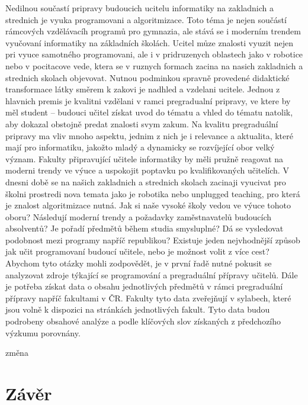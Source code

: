 \documentclass[FP,DP]{tulthesis}
\begin{document}
Nedilnou součastí pripravy budoucich ucitelu informatiky na zakladnich a strednich  je vyuka programovani a algoritmizace. Toto téma je nejen součástí rámcových vzdělávacíh programů pro gymnazia, ale stává se i moderním trendem vyučovaní informatiky na základních školách. Ucitel můze znalosti vyuzit nejen pri vyuce samotného programovani, ale i v pridruzenych oblastech jako v robotice nebo v pocitacove vede, ktera se v ruznych formach zacina na nasich zakladnich a strednich skolach objevovat. Nutnou podminkou spravně provedené didaktické transformace látky směrem  k zakovi je nadhled a vzdelani ucitele. Jednou z hlavnich premis je kvalitni vzdělani v ramci pregradualní pripravy, ve ktere by měl student – budouci učitel získat uvod do tématu a vhled do tématu natolik, aby dokazal obstojně predat znalosti svym zakum. Na kvalitu pregraduální pripravy ma vliv mnoho aspektu, jednim z nich je i relevance a aktualita, které mají pro informatiku, jakožto mladý a dynamicky se rozvíjející obor velký význam. Fakulty připravující učitele informatiky by měli pružně reagovat na moderni trendy ve výuce a uspokojit poptavku po kvalifikovaných učitelích.  V dnesni době se na našich zakladnich a strednich skolach zacinaji vyucivat pro školni prostredi nova temata jako je robotika nebo unplugged teaching, pro která je znalost algoritmizace nutná. Jak si naše vysoké školy vedou ve výuce tohoto oboru? Následují moderní trendy a požadavky zaměstnavatelů budoucích absolventů? Je pořadí předmětů během studia smysluplné? Dá se vysledovat podobnost mezi programy napříč republikou? Existuje  jeden nejvhodnější způsob jak učit programovaní budoucí učitele, nebo je možnost volit z více cest? Abychom tyto otázky mohli zodpovědět, je v první řadě nutné pokusit se analyzovat zdroje týkající se programování a pregraduální přípravy učitelů. Dále je potřeba získat data o obsahu jednotlivých předmětů v rámci pregraduální přípravy napříč fakultami v ČR. Fakulty tyto data zveřejňují v sylabech, které jsou volně k dispozici na stránkách jednotlivých fakult. Tyto data budou podrobeny obsahové analýze a podle klíčových slov získaných z předchozího výzkumu porovnány.

změna 


\chapter{Závěr}
\textcolor{gray}{\Blindtext}
\end{document}
